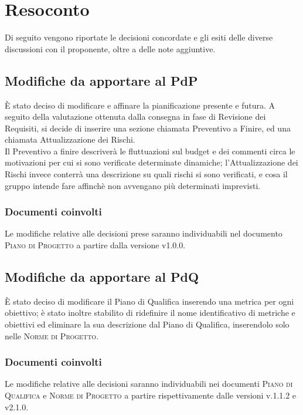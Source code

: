 \documentclass{article}
\begin{document}
\section{Resoconto}
\label{sec:resoconto}

Di seguito vengono riportate le decisioni concordate e gli esiti delle diverse discussioni con il proponente, oltre a 
delle note aggiuntive.

\subsection{Modifiche da apportare al PdP}
\label{itm:1}

È stato deciso di modificare e affinare la pianificazione presente e futura. A seguito della valutazione ottenuta dalla consegna in fase di Revisione dei Requisiti, si decide di inserire una sezione chiamata Preventivo a Finire, ed una chiamata Attualizzazione dei Rischi. \\
Il Preventivo a finire descriverà le fluttuazioni sul budget e dei commenti circa le motivazioni per cui si sono verificate determinate dinamiche; l’Attualizzazione dei Rischi invece conterrà una descrizione su quali rischi si sono verificati, e cosa il gruppo intende fare affinchè non avvengano più determinati imprevisti.

\subsubsection*{Documenti coinvolti}
Le modifiche relative alle decisioni prese saranno individuabili nel documento \textsc{Piano di Progetto} a partire 
dalla versione v1.0.0.

\subsection{Modifiche da apportare al PdQ}
\label{itm:2}

È stato deciso di modificare il Piano di Qualifica inserendo una metrica per ogni obiettivo; è stato inoltre stabilito di ridefinire il nome identificativo di metriche e obiettivi ed eliminare la sua descrizione dal Piano di Qualifica, inserendolo solo nelle \textsc{Norme di Progetto}.\\

\subsubsection*{Documenti coinvolti} 
Le modifiche relative alle decisioni saranno individuabili nei documenti \textsc{Piano di Qualifica} e \textsc{Norme di Progetto} a partire rispettivamente dalle versioni v.1.1.2 e v2.1.0.
\end{document}
